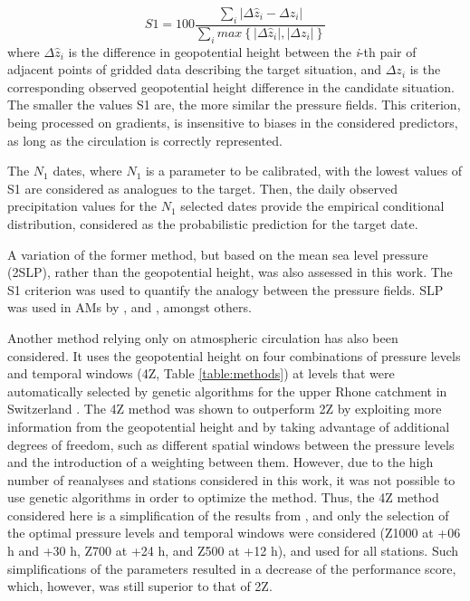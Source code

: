 \documentclass[smallextended]{svjour3}       %
\begin{document}
	\begin{equation}
	\label{eq:S1}
	S1=100 \frac {\displaystyle \sum_{i} \vert \Delta\hat{z}_{i} - \Delta z_{i} \vert}
	{\displaystyle \sum_{i} max\left\lbrace \vert \Delta\hat{z}_{i} \vert , \vert \Delta z_{i} \vert \right\rbrace }
	\end{equation}
	where $\Delta \hat{z}_{i}$ is the difference in geopotential height between the \textit{i}-th pair of adjacent points of gridded data describing the target situation, and $\Delta z_{i}$ is the corresponding observed geopotential height difference in the candidate situation. The smaller the values S1 are, the more similar the pressure fields. This criterion, being processed on gradients, is insensitive to biases in the considered predictors, as long as the circulation is correctly represented.
	
	The $N_{1}$ dates, where $N_{1}$ is a parameter to be calibrated, with the lowest values of S1 are considered as analogues to the target. Then, the daily observed precipitation values for the $N_{1}$ selected dates provide the empirical conditional distribution, considered as the probabilistic prediction for the target date.
	
	A variation of the former method, but based on the mean sea level pressure (2SLP), rather than the geopotential height, was also assessed in this work. The S1 criterion was used to quantify the analogy between the pressure fields. SLP was used in AMs by \citet{Zorita1999}, \citet{Timbal2001a} and \citet{Martin2014b}, amongst others.
	
	Another method relying only on atmospheric circulation has also been considered. It uses the geopotential height on four combinations of pressure levels and temporal windows (4Z, Table \ref{table:methods}) at levels that were automatically selected by genetic algorithms for the upper Rhone catchment in Switzerland \citep{Horton2017b}. The 4Z method was shown to outperform 2Z by exploiting more information from the geopotential height and by taking advantage of additional degrees of freedom, such as different spatial windows between the pressure levels and the introduction of a weighting between them. However, due to the high number of reanalyses and stations considered in this work, it was not possible to use genetic algorithms in order to optimize the method. Thus, the 4Z method considered here is a simplification of the results from \citet{Horton2017b}, and only the selection of the optimal pressure levels and temporal windows were considered (Z1000 at +06 h and +30 h, Z700 at +24 h, and Z500 at +12 h), and used for all stations. Such simplifications of the parameters resulted in a decrease of the performance score, which, however, was still superior to that of 2Z.
	
\end{document}
